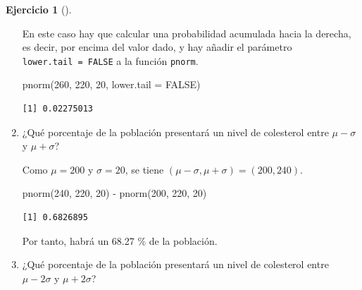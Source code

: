 \documentclass[
  a4paper,
]{scrreport}
\newenvironment{Shaded}{\begin{snugshade}}{\end{snugshade}}
\newcommand{\AttributeTok}[1]{\textcolor[rgb]{0.40,0.45,0.13}{#1}}
\newcommand{\ConstantTok}[1]{\textcolor[rgb]{0.56,0.35,0.01}{#1}}
\newcommand{\DecValTok}[1]{\textcolor[rgb]{0.68,0.00,0.00}{#1}}
\newcommand{\FunctionTok}[1]{\textcolor[rgb]{0.28,0.35,0.67}{#1}}
\newcommand{\NormalTok}[1]{\textcolor[rgb]{0.00,0.23,0.31}{#1}}
\newcommand{\SpecialCharTok}[1]{\textcolor[rgb]{0.37,0.37,0.37}{#1}}
\theoremstyle{definition}
\newtheorem{exercise}{Ejercicio}[chapter]
\theoremstyle{remark}
\begin{document}
\begin{exercise}[]
\begin{enumerate}
\begin{tcolorbox}
  En este caso hay que calcular una probabilidad acumulada hacia la
  derecha, es decir, por encima del valor dado, y hay añadir el
  parámetro \texttt{lower.tail\ =\ FALSE} a la función \texttt{pnorm}.

\begin{Shaded}
\begin{Highlighting}[]
\FunctionTok{pnorm}\NormalTok{(}\DecValTok{260}\NormalTok{, }\DecValTok{220}\NormalTok{, }\DecValTok{20}\NormalTok{, }\AttributeTok{lower.tail =} \ConstantTok{FALSE}\NormalTok{)}
\end{Highlighting}
\end{Shaded}

\begin{verbatim}
[1] 0.02275013
\end{verbatim}

  \end{tcolorbox}
\item
  ¿Qué porcentaje de la población presentará un nivel de colesterol
  entre \(\mu-\sigma\) y \(\mu+\sigma\)?

  \begin{tcolorbox}[enhanced jigsaw, toprule=.15mm, rightrule=.15mm, arc=.35mm, colback=white, colbacktitle=quarto-callout-tip-color!10!white, toptitle=1mm, left=2mm, colframe=quarto-callout-tip-color-frame, opacityback=0, breakable, opacitybacktitle=0.6, bottomtitle=1mm, titlerule=0mm, title=\textcolor{quarto-callout-tip-color}{\faLightbulb}\hspace{0.5em}{Solución}, bottomrule=.15mm, coltitle=black, leftrule=.75mm]

  Como \(\mu=200\) y \(\sigma=20\), se tiene
  \((\mu-\sigma, \mu+\sigma) = (200, 240)\).

\begin{Shaded}
\begin{Highlighting}[]
\FunctionTok{pnorm}\NormalTok{(}\DecValTok{240}\NormalTok{, }\DecValTok{220}\NormalTok{, }\DecValTok{20}\NormalTok{) }\SpecialCharTok{{-}} \FunctionTok{pnorm}\NormalTok{(}\DecValTok{200}\NormalTok{, }\DecValTok{220}\NormalTok{, }\DecValTok{20}\NormalTok{)}
\end{Highlighting}
\end{Shaded}

\begin{verbatim}
[1] 0.6826895
\end{verbatim}

  Por tanto, habrá un 68.27 \% de la población.

  \end{tcolorbox}
\item
  ¿Qué porcentaje de la población presentará un nivel de colesterol
  entre \(\mu-2\sigma\) y \(\mu+2\sigma\)?


\end{enumerate}
\end{exercise}
\end{document}
